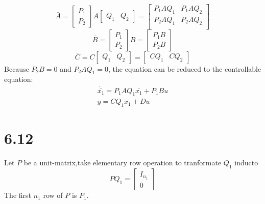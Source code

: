 \documentclass{article}
\begin{document}
\[
\bar{A}=
\left[
    \begin{array}{c}
        P_1\\
        P_2
    \end{array}
\right]A
\left[
    \begin{array}{cc}
        Q_1 &Q_2
    \end{array}
\right]=
\left[
    \begin{array}{cc}
        P_1AQ_1 & P_1AQ_2\\
        P_2AQ_1 & P_2AQ_2\\
    \end{array}
\right]
\]
\[
\bar{B}=\left[
\begin{array}{c}
    P_1\\
    P_2
\end{array}
\right]B=
\left[
    \begin{array}{c}
        P_1B\\
        P_2B
    \end{array}
\right]    
\]
\[
\bar{C}=C
\left[
    \begin{array}{cc}
        Q_1 & Q_2
    \end{array}
\right]=
\left[
    \begin{array}{cc}
        CQ_1 & CQ_2
    \end{array}
\right]
\]
Because $P_2B=0$ and $P_2AQ_1=0$, the equation can be reduced to the controllable equation:
\[
    \begin{split}
    \dot{\bar{x_1}}=P_1AQ_1\bar{x_1}+P_1Bu\\
    y=CQ_1\bar{x_1}+Du
    \end{split}
\] 
\section*{6.12}
Let $P$ be a unit-matrix,take elementary row operation to tranformate $Q_1$ inducto
\[
PQ_1=
\left[
    \begin{array}{c}
        I_{n_1}\\
        0
    \end{array}
\right]    
\]
The first $n_1$ row of $P$ is $P_1$.
\end{document}
